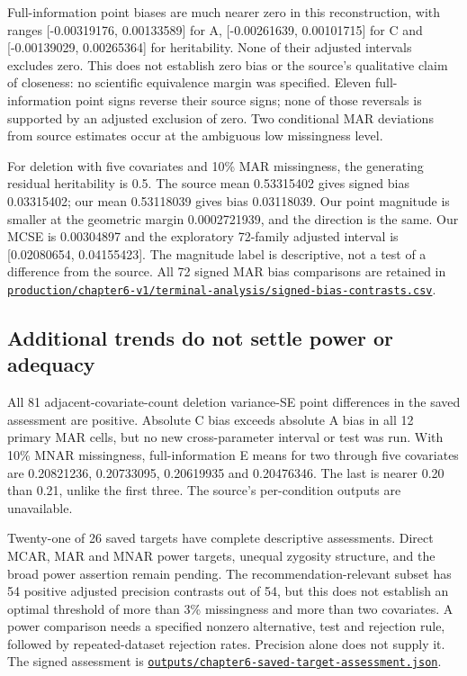\documentclass[11pt]{article}
\newcommand{\file}[1]{\href{https://github.com/alectionary/vibe-math/blob/master/formalization/schwabe-psychometric-genetics/#1}{\nolinkurl{#1}}}
\begin{document}
Full-information point biases are much nearer zero in this reconstruction, with ranges [-0.00319176, 0.00133589] for A, [-0.00261639, 0.00101715] for C and [-0.00139029, 0.00265364] for heritability. None of their adjusted intervals excludes zero. This does not establish zero bias or the source's qualitative claim of closeness: no scientific equivalence margin was specified. Eleven full-information point signs reverse their source signs; none of those reversals is supported by an adjusted exclusion of zero. Two conditional MAR deviations from source estimates occur at the ambiguous low missingness level.

For deletion with five covariates and 10\% MAR missingness, the generating residual heritability is 0.5. The source mean 0.53315402 gives signed bias 0.03315402; our mean 0.53118039 gives bias 0.03118039. Our point magnitude is smaller at the geometric margin 0.0002721939, and the direction is the same. Our MCSE is 0.00304897 and the exploratory 72-family adjusted interval is [0.02080654, 0.04155423]. The magnitude label is descriptive, not a test of a difference from the source. All 72 signed MAR bias comparisons are retained in \file{production/chapter6-v1/terminal-analysis/signed-bias-contrasts.csv}.

\subsection{Additional trends do not settle power or adequacy}
All 81 adjacent-covariate-count deletion variance-SE point differences in the saved assessment are positive. Absolute C bias exceeds absolute A bias in all 12 primary MAR cells, but no new cross-parameter interval or test was run. With 10\% MNAR missingness, full-information E means for two through five covariates are 0.20821236, 0.20733095, 0.20619935 and 0.20476346. The last is nearer 0.20 than 0.21, unlike the first three. The source's per-condition outputs are unavailable.

Twenty-one of 26 saved targets have complete descriptive assessments. Direct MCAR, MAR and MNAR power targets, unequal zygosity structure, and the broad power assertion remain pending. The recommendation-relevant subset has 54 positive adjusted precision contrasts out of 54, but this does not establish an optimal threshold of more than 3\% missingness and more than two covariates. A power comparison needs a specified nonzero alternative, test and rejection rule, followed by repeated-dataset rejection rates. Precision alone does not supply it. The signed assessment is \file{outputs/chapter6-saved-target-assessment.json}.
\end{document}
